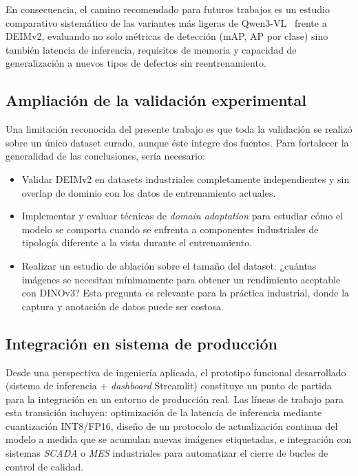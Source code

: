 En consecuencia, el camino recomendado para futuros trabajos es un estudio comparativo sistemático de las variantes más ligeras de Qwen3-VL~\cite{bai2025qwen3vl} frente a DEIMv2, evaluando no solo métricas de detección (mAP, AP por clase) sino también latencia de inferencia, requisitos de memoria y capacidad de generalización a nuevos tipos de defectos sin reentrenamiento.

\subsection{Ampliación de la validación experimental}

Una limitación reconocida del presente trabajo es que toda la validación se realizó sobre un único dataset curado, aunque éste integre dos fuentes. Para fortalecer la generalidad de las conclusiones, sería necesario:

\begin{itemize}
    \item Validar DEIMv2 en datasets industriales completamente independientes y sin overlap de dominio con los datos de entrenamiento actuales.
    \item Implementar y evaluar técnicas de \textit{domain adaptation} para estudiar cómo el modelo se comporta cuando se enfrenta a componentes industriales de tipología diferente a la vista durante el entrenamiento.
    \item Realizar un estudio de ablación sobre el tamaño del dataset: ¿cuántas imágenes se necesitan mínimamente para obtener un rendimiento aceptable con DINOv3? Esta pregunta es relevante para la práctica industrial, donde la captura y anotación de datos puede ser costosa.
\end{itemize}

\subsection{Integración en sistema de producción}

Desde una perspectiva de ingeniería aplicada, el prototipo funcional desarrollado (sistema de inferencia + \textit{dashboard} Streamlit) constituye un punto de partida para la integración en un entorno de producción real. Las líneas de trabajo para esta transición incluyen: optimización de la latencia de inferencia mediante cuantización INT8/FP16, diseño de un protocolo de actualización continua del modelo a medida que se acumulan nuevas imágenes etiquetadas, e integración con sistemas \textit{SCADA} o \textit{MES} industriales para automatizar el cierre de bucles de control de calidad.
